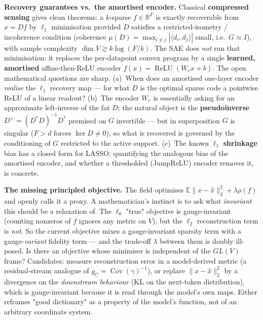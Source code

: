 \textbf{Recovery guarantees vs.\ the amortised encoder.} Classical \textbf{compressed sensing} gives clean theorems: a $k$-sparse $f\in\mathbb{R}^{F}$ is exactly recoverable from $x=Df$ by $\ell_1$ minimisation provided $D$ satisfies a restricted-isometry / incoherence condition (coherence $\mu(D)=\max_{i\neq j}|\langle d_i,d_j\rangle|$ small, i.e.\ $G\approx I$), with sample complexity $\dim V\gtrsim k\log(F/k)$. The SAE does \emph{not} run that minimisation: it replaces the per-datapoint convex program by a single \textbf{learned, amortised} affine-then-ReLU encoder $f(x)=\operatorname{ReLU}(W_e x+b)$. The open mathematical questions are sharp. (a)~When does an amortised one-layer encoder \emph{realise} the $\ell_1$ recovery map --- for what $D$ is the optimal sparse code a pointwise ReLU of a linear readout? (b)~The encoder $W_e$ is essentially asking for an approximate left-inverse of the fat $D$; the natural object is the \textbf{pseudoinverse} $D^{+}=(D^{*}D)^{-1}D^{*}$ premised on $G$ invertible --- but in superposition $G$ is singular ($F>d$ forces $\ker D\neq 0$), so what is recovered is governed by the conditioning of $G$ restricted to the active support. (c)~The known $\ell_1$ \textbf{shrinkage} bias has a closed form for LASSO; quantifying the analogous bias of the amortised encoder, and whether a thresholded (JumpReLU) encoder removes it, is concrete.

\textbf{The missing principled objective.} The field optimises $\mathbb{E}\lVert x-\hat x\rVert_2^2+\lambda\rho(f)$ and openly calls it a proxy. A mathematician's instinct is to ask what \emph{invariant} this should be a relaxation of. The $\ell_0$ "true" objective is gauge-invariant (counting nonzeros of $f$ ignores any metric on $V$), but the $\ell_2$ reconstruction term is \emph{not}. So the current objective mixes a gauge-invariant sparsity term with a gauge-\emph{variant} fidelity term --- and the trade-off $\lambda$ between them is doubly ill-posed. Is there an objective whose minimiser is independent of the $GL(V)$ frame? Candidates: measure reconstruction error in a model-derived metric (a residual-stream analogue of $g_C=\operatorname{Cov}(\gamma)^{-1}$), or replace $\lVert x-\hat x\rVert_2^2$ by a divergence on the \emph{downstream behaviour} (KL on the next-token distribution), which is gauge-invariant because it is read through the model's own maps. Either reframes "good dictionary" as a property of the model's function, not of an arbitrary coordinate system.

